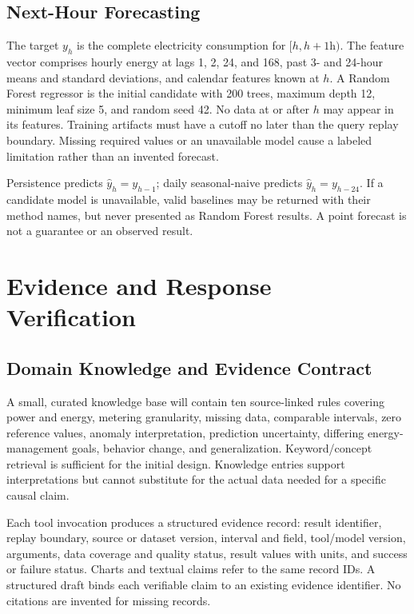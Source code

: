 \documentclass[conference]{IEEEtran}
\begin{document}
\subsection{Next-Hour Forecasting}
The target $y_h$ is the complete electricity consumption for $[h,h+1\mathrm{h})$. The feature vector comprises hourly energy at lags 1, 2, 24, and 168, past 3- and 24-hour means and standard deviations, and calendar features known at $h$. A Random Forest regressor is the initial candidate with 200 trees, maximum depth 12, minimum leaf size 5, and random seed 42. No data at or after $h$ may appear in its features. Training artifacts must have a cutoff no later than the query replay boundary. Missing required values or an unavailable model cause a labeled limitation rather than an invented forecast.

Persistence predicts $\hat y_h=y_{h-1}$; daily seasonal-naive predicts $\hat y_h=y_{h-24}$. If a candidate model is unavailable, valid baselines may be returned with their method names, but never presented as Random Forest results. A point forecast is not a guarantee or an observed result.

\section{Evidence and Response Verification}
\subsection{Domain Knowledge and Evidence Contract}
A small, curated knowledge base will contain ten source-linked rules covering power and energy, metering granularity, missing data, comparable intervals, zero reference values, anomaly interpretation, prediction uncertainty, differing energy-management goals, behavior change, and generalization. Keyword/concept retrieval is sufficient for the initial design. Knowledge entries support interpretations but cannot substitute for the actual data needed for a specific causal claim.

Each tool invocation produces a structured evidence record: result identifier, replay boundary, source or dataset version, interval and field, tool/model version, arguments, data coverage and quality status, result values with units, and success or failure status. Charts and textual claims refer to the same record IDs. A structured draft binds each verifiable claim to an existing evidence identifier. No citations are invented for missing records.
\end{document}
